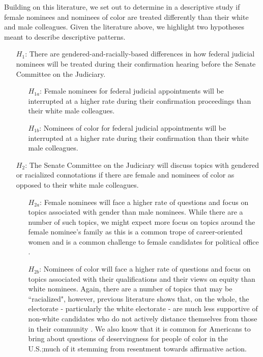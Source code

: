 \documentclass [12pt]{article}
\begin{document}
Building on this literature, we set out to determine in a descriptive study if female nominees and nominees of color are treated differently than their white and male colleagues. Given the literature above, we highlight two hypotheses meant to describe descriptive patterns.

\begin{itemize}
\item[\textit{$H_1$}:] There are gendered-and-racially-based differences in how federal judicial nominees will be treated during their confirmation hearing before the Senate Committee on the Judiciary.
\begin{itemize}
    \item[\textit{$H_{1a}$}:] Female nominees for federal judicial appointments will be interrupted at a higher rate during their confirmation proceedings than their white male colleagues. 
    \item[\textit{$H_{1b}$}:] Nominees of color for federal judicial appointments will be interrupted at a higher rate during their confirmation than their white male colleagues.
\end{itemize}

\item[\textit{$H_2$}:] The Senate Committee on the Judiciary will discuss topics with gendered or racialized connotations if there are female and nominees of color as opposed to their white male colleagues. 
\begin{itemize}
    \item[\textit{$H_{2a}$}:] Female nominees will face a higher rate of questions and focus on topics associated with gender than male nominees. While there are a number of such topics, we might expect more focus on topics around the female nominee's family as this is a common trope of career-oriented women and is a common challenge to female candidates for political office \citep[see][]{sanbonmatsu_dolan_2009}.
    \item[\textit{$H_{2b}$}:] Nominees of color will face a higher rate of questions and focus on topics associated with their qualifications and their views on equity than white nominees. Again, there are a number of topics that may be ``racialized", however, previous literature shows that, on the whole, the electorate - particularly the white electorate - are much less supportive of non-white candidates who do not actively distance themselves from those in their community \citep{stephens_dougan_2020}. We also know that it is common for Americans to bring about questions of deservingness for people of color in the U.S.\citep{gilens_1999};much of it stemming from resentment towards affirmative action.
\end{itemize}
\end{itemize}	
\end{document}
